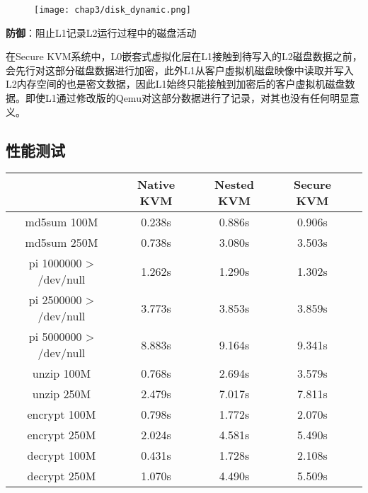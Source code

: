 \begin{figure}[!htbp]
  \centering
  \texttt{[image: chap3/disk\_dynamic.png]}
\end{figure}

\noindent
\textbf{防御\uppercase\expandafter{}}：阻止L1记录L2运行过程中的磁盘活动

在Secure KVM系统中，L0嵌套式虚拟化层在L1接触到待写入的L2磁盘数据之前，会先行对这部分磁盘数据进行加密，此外L1从客户虚拟机磁盘映像中读取并写入L2内存空间的也是密文数据，因此L1始终只能接触到加密后的客户虚拟机磁盘数据。即使L1通过修改版的Qemu对这部分数据进行了记录，对其也没有任何明显意义。

\subsection{性能测试}

\begin{table}[htbp]
  \centering
    \begin{tabular}{ccccc}
    \toprule
          & Native KVM & Nested KVM & Secure KVM \\
    \midrule
    md5sum 100M & 0.238s & 0.886s & 0.906s \\
    md5sum 250M & 0.738s & 3.080s & 3.503s \\
    pi 1000000 > /dev/null & 1.262s & 1.290s & 1.302s \\
    pi 2500000 > /dev/null & 3.773s & 3.853s & 3.859s \\
    pi 5000000 > /dev/null & 8.883s & 9.164s & 9.341s \\
    unzip 100M & 0.768s & 2.694s & 3.579s \\
    unzip 250M & 2.479s & 7.017s & 7.811s \\
    encrypt 100M & 0.798s & 1.772s & 2.070s \\
    encrypt 250M & 2.024s & 4.581s & 5.490s \\
    decrypt 100M & 0.431s & 1.728s & 2.108s \\
    decrypt 250M & 1.070s & 4.490s & 5.509s \\
    \bottomrule
    \end{tabular}%
\end{table}%


